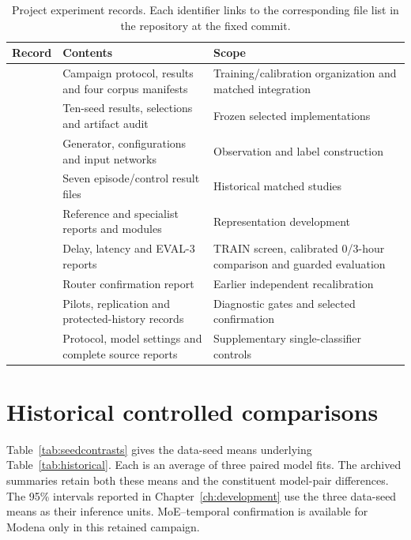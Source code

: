 \begin{table}[tbp]\centering\small
\caption[Register of project evidence]{Project experiment records. Each identifier links to the corresponding file list in the repository at the fixed commit.}\label{tab:evidenceregister}
\begin{tabularx}{\linewidth}{@{}lYY@{}}\toprule
Record & Contents & Scope\\\midrule
{}\label{ev:E1} & Campaign protocol, results and four corpus manifests & Training/calibration organization and matched integration\\
\label{ev:E2} & Ten-seed results, selections and artifact audit & Frozen selected implementations\\
\label{ev:E3} & Generator, configurations and input networks & Observation and label construction\\
\label{ev:E4} & Seven episode/control result files & Historical matched studies\\
\label{ev:E5} & Reference and specialist reports and modules & Representation development\\
\label{ev:E6} & Delay, latency and EVAL-3 reports & TRAIN screen, calibrated 0/3-hour comparison and guarded evaluation\\
\label{ev:E7} & Router confirmation report & Earlier independent recalibration\\
\label{ev:E8} & Pilots, replication and protected-history records & Diagnostic gates and selected confirmation\\
\label{ev:E9} & Protocol, model settings and complete source reports & Supplementary single-classifier controls\\
\bottomrule\end{tabularx}\end{table}

\section{Historical controlled comparisons}
Table~\ref{tab:seedcontrasts} gives the data-seed means underlying Table~\ref{tab:historical}. Each is an average of three paired model fits. The archived summaries retain both these means and the constituent model-pair differences. The 95\% intervals reported in Chapter~\ref{ch:development} use the three data-seed means as their inference units. MoE--temporal confirmation is available for Modena only in this retained campaign.

